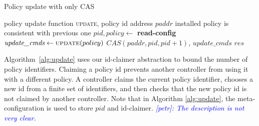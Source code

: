 \documentclass[conference]{sigcomm-alternate}
\newcommand{\hide}[1]{}
\newcommand{\paddr}{\textit{paddr}\xspace}
\newcommand{\pid}{\textit{pid}\xspace}
\newcommand{\ufunc}{update} %
\newcommand{\liron}[1]{\textit{\textcolor{mygreen}{[liron]: #1}}} %
\newcommand{\petr}[1]{\textit{\textcolor{blue}{[petr]: #1}}} %
\newcommand{\ack}{\textit{ack}}
\begin{document}


{\small
\begin{algorithm}[t]
    \caption{Policy update with only CAS}
    \label{alg:simple-update}
    \begin{algorithmic}[1]
    \Require policy update function \textsc{\ufunc}, policy id address $\paddr$
    \Ensure installed policy is consistent with previous one
 		\Repeat
 			\State $\pid,\textit{policy}\gets$ \textbf{read-config} %
 			\State $\textit{update\_cmds}\gets \textsc{\ufunc}(policy)$
 			\startTxn
	 			\State $CAS(\paddr,\pid,\pid+1)$,
	 			\State $\textit{update\_cmds}$ %
 			\endTxn
     	\Until{$\textit{res}=\ack$}
			\Return $\textit{res}$

    \end{algorithmic}
\end{algorithm}
}

%
\hide{
It takes a set of rules $U$ (not yet a policy)and proceeds as follows: first, we seek to
 obtain a unique \emph{id}. FIXME: to be continued...
 \textbf{LS: I am not sure if I need to tell every step of the story or maybe it best to explain the main dif from the previous one similarly to what I just wrote next}.
}
%

Algorithm~\ref{alg:update} uses our id-claimer abstraction
to bound the number of policy identifiers.
Claiming a policy id prevents another controller from using it with a
different policy.
A controller claims the current policy identifier, chooses a new id
from a finite set of identifiers,
and then checks that the new policy id is not claimed by another controller.
Note that in Algorithm \ref{alg:update}, the meta-configuration is
used to store $\textit{pid}$ and id-claimer.
\petr{The description is not very clear.}
\end{document}
